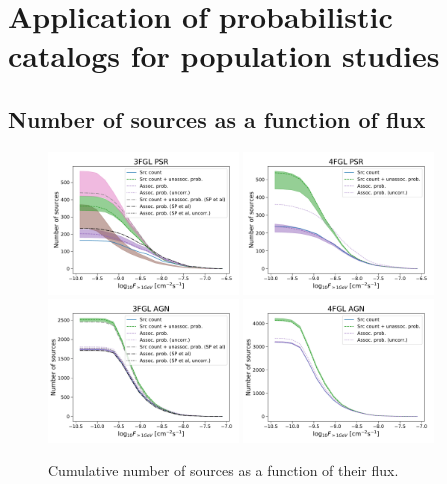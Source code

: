 \section{Application of probabilistic catalogs for population studies}

\subsection{Number of sources as a function of flux}



\begin{figure}[h]
\center
\includegraphics[width=0.45\textwidth]{plots/N_logS_3FGL_PSR_SazP.pdf}
\includegraphics[width=0.45\textwidth]{plots/N_logS_4FGL_PSR.pdf} \\
\includegraphics[width=0.45\textwidth]{plots/N_logS_3FGL_AGN_SazP.pdf}
\includegraphics[width=0.45\textwidth]{plots/N_logS_4FGL_AGN.pdf}
\caption{Cumulative number of sources as a function of their flux.}  
\label{fig:logN_logS}
\end{figure}


